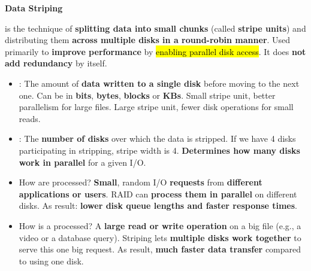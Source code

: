 \newpage

\begin{flushleft}
    \textcolor{Green3}{ \textbf{Data Striping}}
\end{flushleft}
 is the technique of \textbf{splitting data into small chunks} (called \textbf{stripe units}) and distributing them \textbf{across multiple disks in a round-robin manner}. Used primarily to \textbf{improve performance} by \hl{enabling parallel disk access}. It does \textbf{not add redundancy} by itself.
\begin{itemize}
    \item {}: The amount of \textbf{data written to a single disk} before moving to the next one. Can be in \textbf{bits}, \textbf{bytes}, \textbf{blocks} or \textbf{KBs}. Small stripe unit, better parallelism for large files. Large stripe unit, fewer disk operations for small reads.

    \item {}: The \textbf{number of disks} over which the data is stripped. If we have 4 disks participating in stripping, stripe width is 4. \textbf{Determines how many disks work in parallel} for a given I/O.
    
    \item How are  processed? \textbf{Small}, random I/O \textbf{requests} from \textbf{different applications or users}. RAID can \textbf{process them in parallel} on different disks. As result: \textbf{lower disk queue lengths and faster response times}.
    
    \item How is a  processed? A \textbf{large read or write operation} on a big file (e.g., a video or a database query). Striping lets \textbf{multiple disks work together} to serve this one big request. As result, \textbf{much faster data transfer} compared to using one disk.
\end{itemize}


